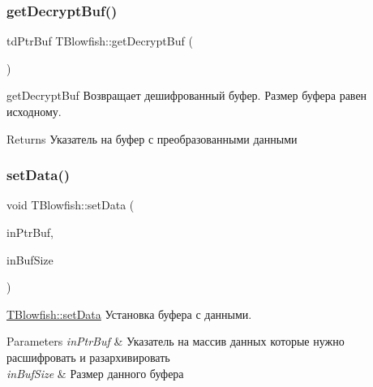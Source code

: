 \subsubsection{\texorpdfstring{get\+Decrypt\+Buf()}{getDecryptBuf()}}
{\footnotesize\ttfamily td\+Ptr\+Buf T\+Blowfish\+::get\+Decrypt\+Buf (\begin{DoxyParamCaption}{ }\end{DoxyParamCaption})}



get\+Decrypt\+Buf Возвращает дешифрованный буфер. Размер буфера равен исходному. 

\begin{DoxyReturn}{Returns}
Указатель на буфер с преобразованными данными 
\end{DoxyReturn}
\mbox{\label{classunit_test_1_1_t_blowfish_aac58cd909cef267ba409859c279dc521}} 
\subsubsection{\texorpdfstring{set\+Data()}{setData()}}
{\footnotesize\ttfamily void T\+Blowfish\+::set\+Data (\begin{DoxyParamCaption}\item[{td\+Ptr\+Buf}]{in\+Ptr\+Buf,  }\item[{quint32}]{in\+Buf\+Size }\end{DoxyParamCaption})}



\hyperlink{classunit_test_1_1_t_blowfish_aac58cd909cef267ba409859c279dc521}{T\+Blowfish\+::set\+Data} Установка буфера с данными. 


\begin{DoxyParams}{Parameters}
{\em in\+Ptr\+Buf} & Указатель на массив данных которые нужно расшифровать и разархивировать \\
\hline
{\em in\+Buf\+Size} & Размер данного буфера \\
\hline
\end{DoxyParams}
\mbox{\label{classunit_test_1_1_t_blowfish_a17896279118b13a237ab31c1cb82da26}} 
